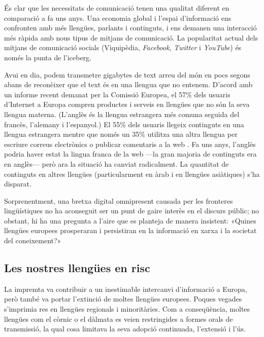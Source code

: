 \begin{multicols}{2}
És clar que les necessitats de comunicació tenen una qualitat diferent en comparació a fa uns anys. Una economia global i l’espai d’informació ens confronten amb més llengües, parlants i continguts, i ens demanen una interacció més ràpida amb nous tipus de mitjans de comunicació. La popularitat actual dels mitjans de comunicació socials (Viquipèdia, \textit{Facebook}, \textit{Twitter} i \textit{YouTube}) és només la punta de l’iceberg. 

Avui en dia, podem transmetre gigabytes de text arreu del món en pocs segons abans de reconèixer que el text és en una llengua que no entenem. D’acord amb un informe recent demanat per la Comissió Europea, el 57\% dels usuaris d’Internet a Europa compren productes i serveis en llengües que no són la seva llengua materna. (L’anglès és la llengua estrangera més comuna seguida del francès, l’alemany i l’espanyol.) El 55\% dels usuaris llegeix continguts en una llengua estrangera mentre que només un 35\% utilitza una altra llengua per escriure correus electrònics o publicar comentaris a la web \cite{CAT-Nota1}. Fa uns anys, l’anglès podria haver estat la lingua franca de la web —la gran majoria de continguts era en anglès— però ara la situació ha canviat radicalment. La quantitat de continguts en altres llengües (particularment en àrab i en llengües asiàtiques)  s’ha disparat.

Sorprenentment, una bretxa digital omnipresent causada per les fronteres lingüístiques no ha aconseguit ser un punt de gaire interès en el discurs públic; no obstant, hi ha una pregunta a l’aire que es planteja de manera insistent: «Quines llengües europees prosperaran i persistiran en la informació en xarxa i la societat del coneixement?»

\subsection{Les nostres llengües en risc}

La impremta va contribuir a un inestimable intercanvi d’informació a Europa, però també va portar l’extinció de moltes llengües europees. Poques vegades s’imprimia res en llengües regionals i minoritàries. Com a conseqüència, moltes llengües com el còrnic o el dàlmata es veien restringides a formes orals de transmissió, la qual cosa limitava la seva adopció continuada, l’extensió i l’ús. 



\end{multicols}
